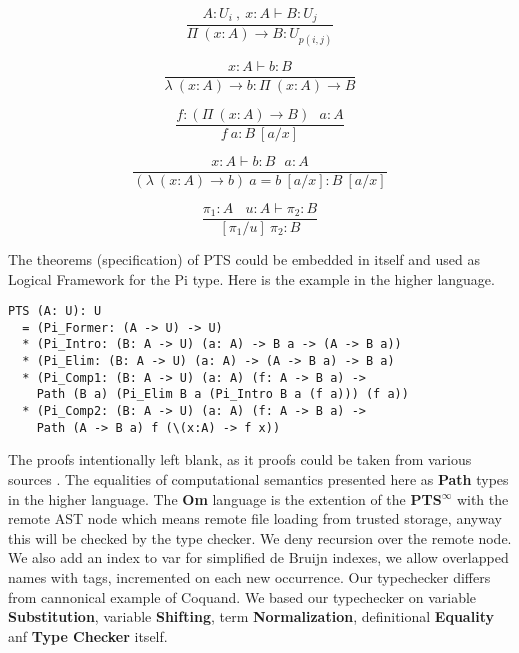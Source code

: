 \begin{equation}
\tag{$\Pi$-formation}
\dfrac
{A:U_i\ ,\ x:A \vdash B : U_j}
{\Pi\ (x:A) \rightarrow B : U_{p(i,j)}}
\end{equation}

\begin{equation}
\tag{$\lambda$-intro}
\dfrac
{x:A \vdash b : B}
{\lambda\ (x:A) \rightarrow b : \Pi\ (x: A) \rightarrow B }
\end{equation}

\begin{equation}
\tag{$App$-elimination}
\dfrac
{f: (\Pi\ (x:A) \rightarrow B)\ \ \ a: A}
{f\ a : B\ [a/x]}
\end{equation}

\begin{equation}
\tag{$\beta$-computation}
\dfrac
{x:A \vdash b: B\ \ \ a:A}
{(\lambda\ (x:A) \rightarrow b)\ a = b\ [a/x] : B\ [a/x]}
\end{equation}

\begin{equation}
\tag{subst}
\dfrac
{\pi_1 : A\ \ \ \ u:A \vdash \pi_2 : B}
{[\pi_1/u]\ \pi_2 : B}
\end{equation}

The theorems (specification) of PTS could be embedded in itself and used as
Logical Framework for the Pi type. Here is the example in the higher language.

\begin{lstlisting}[mathescape=true]
PTS (A: U): U
  = (Pi_Former: (A -> U) -> U)
  * (Pi_Intro: (B: A -> U) (a: A) -> B a -> (A -> B a))
  * (Pi_Elim: (B: A -> U) (a: A) -> (A -> B a) -> B a)
  * (Pi_Comp1: (B: A -> U) (a: A) (f: A -> B a) ->
    Path (B a) (Pi_Elim B a (Pi_Intro B a (f a))) (f a))
  * (Pi_Comp2: (B: A -> U) (a: A) (f: A -> B a) ->
    Path (A -> B a) f (\(x:A) -> f x))
\end{lstlisting}

The proofs intentionally left blank, as it proofs could be taken from various sources \cite{Henk93}.
The equalities of computational semantics presented here as {\bf Path} types in the higher language.
The {\bf Om} language is the extention of the {\bf PTS$^\infty$} with the remote AST node which means remote file loading from trusted storage, anyway this will be checked by the type checker.
We deny recursion over the remote node.
We also add an index to var for simplified de Bruijn indexes, we allow overlapped names with tags, incremented on each new occurrence.
Our typechecker differs from cannonical example of Coquand\cite{Coq96}. 
We based our typechecker on variable {\bf Substitution}, variable {\bf Shifting}, term {\bf Normalization}, definitional {\bf Equality} anf {\bf Type Checker} itself.


